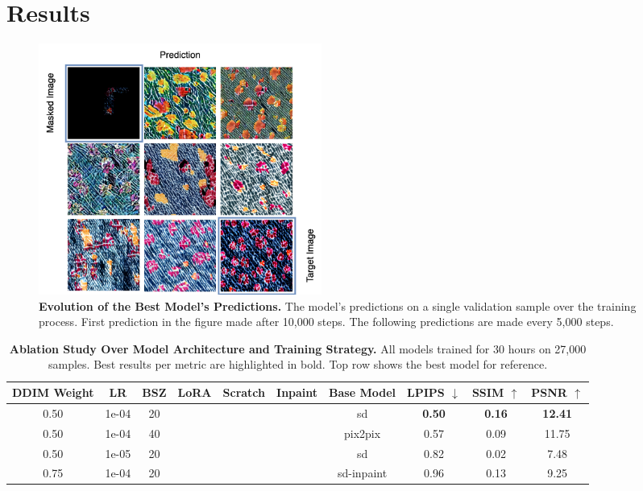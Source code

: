 \documentclass[11pt,twocolumn]{article}
\newcommand{\cmark}{\checkmark}
\newcommand{\xmark}{\ding{55}}
\begin{document}

\section{Results}
\begin{figure}[t]
  \centering
  \includegraphics[width=0.45\textwidth]{figures/pbr_test_overview.png}
  \caption{\textbf{Evolution of the Best Model's Predictions.} 
  The model's predictions on a single validation sample over the training process. First prediction in the figure made 
  after 10,000 steps. The following predictions are made every 5,000 steps.}
  \label{fig:test-overview}
\end{figure}

\begin{table}[t]
  \centering
    \begin{tabular}{ccccccc|ccc}
    \toprule
    \textbf{DDIM Weight} & \textbf{LR} & \textbf{BSZ} & \textbf{LoRA} & \textbf{Scratch} & \textbf{Inpaint} & \textbf{Base Model} & \textbf{LPIPS} $\downarrow$ & \textbf{SSIM} $\uparrow$ & \textbf{PSNR} $\uparrow$ \\
    \midrule
    0.50 & 1e-04 & 20 & \xmark & \xmark & \xmark & sd & \textbf{0.50} & \textbf{0.16} & \textbf{12.41} \\
    \midrule
    0.50 & 1e-04 & 40 & \cmark & \xmark & \xmark & pix2pix & 0.57 & 0.09 & 11.75 \\
    0.50 & 1e-05 & 20 & \xmark & \cmark & \xmark & sd & 0.82 & 0.02 & 7.48 \\
    \midrule
    0.75 & 1e-04 & 20 & \cmark & \xmark & \cmark & sd-inpaint & 0.96 & 0.13 & 9.25 \\

    \bottomrule
    \end{tabular}
    \caption{\textbf{Ablation Study Over Model Architecture and Training Strategy.} 
    All models trained for 30 hours on 27,000 samples. Best results per metric are highlighted in bold. 
    Top row shows the best model for reference.}
    \label{tab:arch-ablation}
\end{table}
\end{document}
